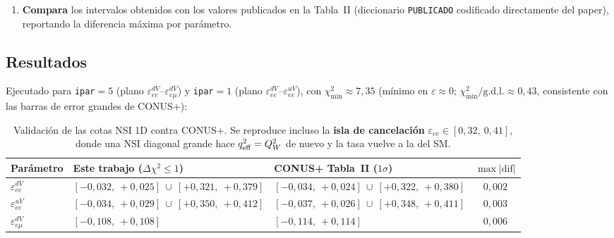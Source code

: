 \documentclass[11pt,a4paper]{article}
\newcommand{\eps}{\varepsilon}
\newcommand{\QW}{Q_{W}}
\newcommand{\qeff}{q_{\rm eff}}
\newcommand{\code}[1]{\texttt{#1}}
\begin{document}
\begin{enumerate}
    de la isla de cancelaci\'on), el error de esta interpolaci\'on lineal frente
    al cruce exacto es $\mathcal{O}(\Delta\eps^{2})\sim10^{-5}$--$10^{-6}$ en
    $\eps$, muy por debajo de la diferencia $\lesssim0{,}003$--$0{,}006$ reportada
    en la Tabla~\ref{tab:conusval}: la interpolaci\'on \emph{no} es la fuente de
    esa diferencia residual, que hay que atribuir a la digitalizaci\'on de
    esos excesos (Sec.~\ref{sec:2pchi2}) o a peque\~nas diferencias num\'ericas en la
    integraci\'on.
  \item \textbf{Compara} los intervalos obtenidos con los valores publicados en
    la Tabla~II (diccionario \code{PUBLICADO} codificado directamente del paper),
    reportando la diferencia m\'axima por par\'ametro.
\end{enumerate}

\subsection{Resultados}
\label{sec:conus_res}

Ejecutado para \code{ipar}$=5$ (plano $\eps_{ee}^{dV}$--$\eps_{e\mu}^{dV}$) y
\code{ipar}$=1$ (plano $\eps_{ee}^{dV}$--$\eps_{ee}^{uV}$), con
$\chi^{2}_{\min}\approx 7{,}35$ (m\'inimo en $\eps\approx 0$;
$\chi^{2}_{\min}/\text{g.d.l.}\approx 0{,}43$, consistente con las barras de
error grandes de CONUS+):

\begin{table}[h]
\centering
\small
\begin{tabular}{@{}lp{5.4cm}p{5.4cm}c@{}}
\toprule
Par\'ametro & Este trabajo ($\Delta\chi^{2}\!\le\!1$) &
  CONUS+ Tabla~II ($1\sigma$) & $\max|\text{dif}|$ \\
\midrule
$\eps_{ee}^{dV}$   & $[-0{,}032,\ +0{,}025]\ \cup\ [+0{,}321,\ +0{,}379]$
                   & $[-0{,}034,\ +0{,}024]\ \cup\ [+0{,}322,\ +0{,}380]$
                   & $0{,}002$ \\
$\eps_{ee}^{uV}$   & $[-0{,}034,\ +0{,}029]\ \cup\ [+0{,}350,\ +0{,}412]$
                   & $[-0{,}037,\ +0{,}026]\ \cup\ [+0{,}348,\ +0{,}411]$
                   & $0{,}003$ \\
$\eps_{e\mu}^{dV}$ & $[-0{,}108,\ +0{,}108]$
                   & $[-0{,}114,\ +0{,}114]$
                   & $0{,}006$ \\
\bottomrule
\end{tabular}
\caption{Validaci\'on de las cotas NSI 1D contra CONUS+. Se reproduce incluso la
\textbf{isla de cancelaci\'on} $\eps_{ee}\in[0{,}32,\ 0{,}41]$, donde una NSI
diagonal grande hace $\qeff^{2}=\QW^{2}$ de nuevo y la tasa vuelve a la del SM.}
\label{tab:conusval}
\end{table}
\end{document}
